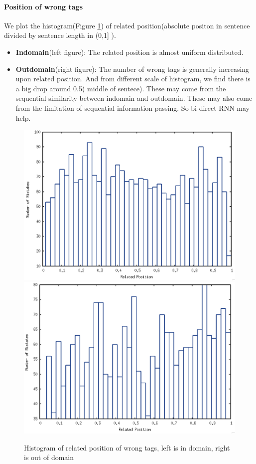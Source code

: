 \documentclass[11pt]{article}
\begin{document}
\paragraph{Position of wrong tags } 
We plot the histogram(Figure \ref{Pos_fig}) of related position(absolute positon in sentence divided by sentence length in (0,1] ). 
\begin{itemize}
\item \textbf{Indomain}(left figure): The related position is almost uniform distributed.
\item \textbf{Outdomain}(right figure): The number of wrong tags  is generally increasing upon related position. And from different scale of histogram, we find there is a big drop around 0.5( middle of sentece). These may come from the sequential similarity between indomain and outdomain. These may also come from the limitation of sequential information passing. So bi-direct RNN may help.
\end{itemize}
\begin{figure}
\includegraphics[scale=0.25]{indomain_pos.png} 
\includegraphics[scale=0.25]{outdomain_pos.png} 
\caption{Histogram of related position of wrong tags, left is in domain, right is out of domain}\label{Pos_fig}
\end{figure}
\end{document}

